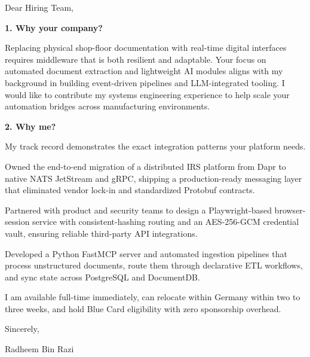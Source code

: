 \documentclass[11pt,a4paper]{coverletter}
\begin{document}

\opening{Dear Hiring Team,}

\vspace{8pt}\noindent\textbf{1. Why your company?}\par\vspace{3pt}

Replacing physical shop-floor documentation with real-time digital interfaces requires middleware that is both resilient and adaptable. Your focus on automated document extraction and lightweight AI modules aligns with my background in building event-driven pipelines and LLM-integrated tooling. I would like to contribute my systems engineering experience to help scale your automation bridges across manufacturing environments.

\vspace{8pt}\noindent\textbf{2. Why me?}\par\vspace{3pt}

My track record demonstrates the exact integration patterns your platform needs.

\bullets

  \item Owned the end-to-end migration of a distributed IRS platform from Dapr to native NATS JetStream and gRPC, shipping a production-ready messaging layer that eliminated vendor lock-in and standardized Protobuf contracts.

  \item Partnered with product and security teams to design a Playwright-based browser-session service with consistent-hashing routing and an AES-256-GCM credential vault, ensuring reliable third-party API integrations.

  \item Developed a Python FastMCP server and automated ingestion pipelines that process unstructured documents, route them through declarative ETL workflows, and sync state across PostgreSQL and DocumentDB.

\bulletsend

I am available full-time immediately, can relocate within Germany within two to three weeks, and hold Blue Card eligibility with zero sponsorship overhead.

\closing{Sincerely,}{Radheem Bin Razi}

\clearpage
{}

\end{document}
